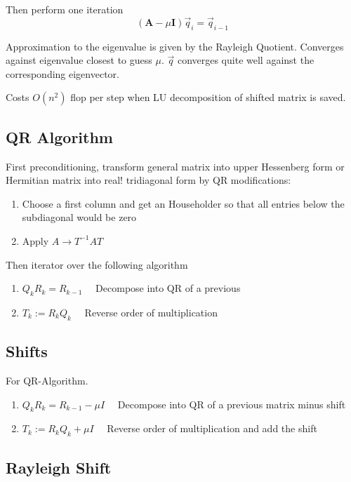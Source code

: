 \documentclass[
    a4paper,
    11pt
]{article}
\begin{document}
Then perform one iteration
\begin{equation}
    (\mathbf{A} - \mu \mathbf{I})\vec{q}_{i} = \vec{q}_{i-1}
\end{equation}

Approximation to the eigenvalue is given by the Rayleigh Quotient. Converges
against eigenvalue closest to guess $\mu$. $\vec{q}$ converges quite well
against the corresponding eigenvector.

Costs $O(n^2)$ flop per step when LU decomposition of shifted matrix is saved.

\subsection{QR Algorithm}

First preconditioning, transform general matrix into upper Hessenberg form or
Hermitian matrix into real! tridiagonal form by QR modifications:
\begin{enumerate}
    \item Choose a first column and get an Householder so that all entries below
        the subdiagonal would be zero
    \item Apply $A \to T^{-1}AT$
\end{enumerate}

Then iterator over the following algorithm
\begin{enumerate}
    \item $Q_k R_k = R_{k-1}\quad$ Decompose into QR of a previous
    \item $T_k := R_k Q_k \quad$ Reverse order of multiplication 
\end{enumerate}


\subsection{Shifts}

For QR-Algorithm. 
\begin{enumerate}
    \item $Q_k R_k = R_{k-1} - \mu I \quad$ Decompose into QR of a previous
        matrix minus shift
    \item $T_k := R_k Q_k + \mu I \quad$ Reverse order of multiplication and add
        the shift
\end{enumerate}

\subsection{Rayleigh Shift}
\end{document}
